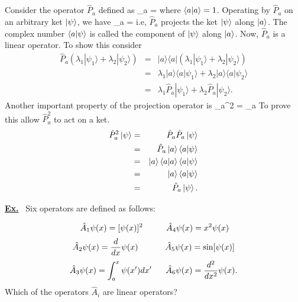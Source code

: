 Consider the operator $\hat{P}_a$ defined as
\be
{}_a = 
\ee
where $\braket{a}{a}=1$.
Operating by $\hat{P}_a$ on an arbitrary ket $\ket{\psi}$, we have
\be
{}_a \ket{\psi} = 
\ee
i.e, $\hat{P}_a$ projects the ket $\ket{\psi}$ along $\ket{a}$. The complex number $\braket{a}{\psi}$ is called 
the component of $\ket{\psi}$ along $\ket{a}$.
Now, $\hat{P}_a$ is a linear operator. To show this consider
\begin{eqnarray*}
\hat{P}_a \left( \lambda_1|\psi_1\rangle + \lambda_2|\psi_2\rangle \right)&= & 
   |a\rangle\langle a|\left(\lambda_1|\psi_1\rangle + \lambda_2|\psi_2\rangle \right)\\
	&=& \lambda_1 |a\rangle \langle a|\psi_1\rangle  + \lambda_2 |a\rangle \langle a|\psi_2 \rangle \\
	&=& \lambda_1 \hat{P}_a|\psi_1\rangle + \lambda_2 \hat{P}_a|\psi_2\rangle.
\end{eqnarray*}
Another important property of the projection operator is
\be
{}_{a}^{2} = _a
\ee
To prove this allow $\hat{P}_{a}^{2}$ to act on a ket.
\begin{eqnarray*}
 \hat{P}_{a}^{2} \ket{\psi} &=& \hat{P}_a \hat{P}_a \ket{\psi}  \\
                            &=& \hat{P}_a \ket{a}\braket{a}{\psi}  \\
                            &=& \ket{a} \braket{a}{a} \braket{a}{\psi}  \\
                            &=& \ket{a} \braket{a}{\psi}  \\
                            &=& \hat{P}_a \ket{\psi}.
\end{eqnarray*}



\vspace{5 mm}
\underline{\textbf{Ex.}} ~Six operators are defined as follows:

\begin{equation*}
 \hspace{1 mm} \hat{A}_1 \psi (x) = [\psi (x)]^2      \hspace{10 mm}                  \hat{A}_4 \psi (x) = x^2 \psi (x)    
\end{equation*}
\begin{equation*}
\hat{A}_2 \psi (x) = \frac{d}{dx}\psi (x)       \hspace{11.5 mm}         \hat{A}_5 \psi (x) = \sin[\psi (x)] 
\end{equation*}
\begin{equation*}
\hat{A}_3 \psi (x) = \int_a^x \psi (x^\prime)dx^\prime  \hspace{6 mm} \hat{A}_6 \psi (x) = \frac{d^2}{dx^2} \psi (x).
\end{equation*}
Which of the operators $\hat{A}_i$ are linear operators?


